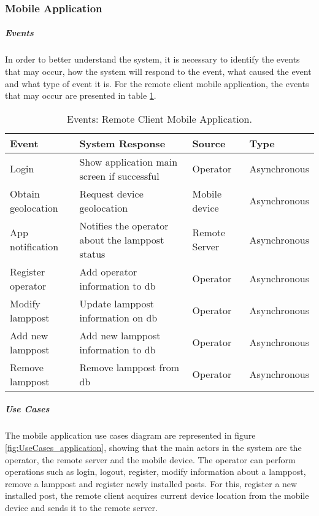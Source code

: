 \subsubsection*{Mobile Application}
\subparagraph*{Events}
In order to better understand the system, it is necessary to identify the events that may occur, how the system will respond to the event, what caused the event and what type of event it is. For the remote client mobile application, the events that may occur are presented in table \ref{table:rc_app_events}.

\begin{table}[ht]
	\centering
	\resizebox{\columnwidth}{!}
	{
		\begin{tabular}{|m{3cm}|m{5cm}|m{2.4cm}|m{2.4cm}|}
			\hline
			\textbf{Event} & \textbf{System Response} & \textbf{Source} & \textbf{Type}\\
			\hline\hline
			Login & Show application main screen if successful & Operator & Asynchronous\\
			\hline
			
			Obtain geolocation & Request device geolocation & Mobile device & Asynchronous\\
			\hline
			
			App notification & Notifies the operator about the lamppost status & Remote Server & Asynchronous\\
			\hline
			
			Register operator & Add operator information to \ac{db} & Operator & Asynchronous\\
			\hline
			
			Modify lamppost & Update lamppost information on \ac{db} & Operator & Asynchronous\\
			\hline
			
			Add new lamppost & Add new lamppost information to \ac{db} & Operator & Asynchronous\\
			\hline			
			
			Remove lamppost & Remove lamppost  from \ac{db} & Operator & Asynchronous\\
			\hline			
		\end{tabular}
	}
	\caption{Events: Remote Client Mobile Application.}
	\label{table:rc_app_events}
\end{table}

\subparagraph*{Use Cases}
The mobile application use cases diagram are represented in figure \ref{fig:UseCases_application}, showing that the main actors in the system are the operator, the remote server and the mobile device. The operator can perform operations such as login, logout, register, modify information about a lamppost, remove a lamppost and register newly installed posts. For this, register a new installed post, the remote client acquires current device location from the mobile device and sends it to the remote server.

